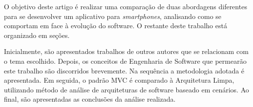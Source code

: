 O objetivo deste artigo é realizar uma comparação de duas abordagens diferentes para se desenvolver um aplicativo para \emph{smartphones}, analisando como se comportam em face à evolução do software.
O restante deste trabalho está organizado em seções.

Inicialmente, são apresentados trabalhos de outros autores que se relacionam com o tema escolhido.
Depois, os conceitos de Engenharia de Software que permearão este trabalho são discorridos brevemente.
Na sequência a metodologia adotada é apresentada.
Em seguida, o padrão MVC é comparado à Arquitetura Limpa, utilizando método de análise de arquiteturas de software baseado em cenários.
Ao final, são apresentadas as conclusões da análise realizada.